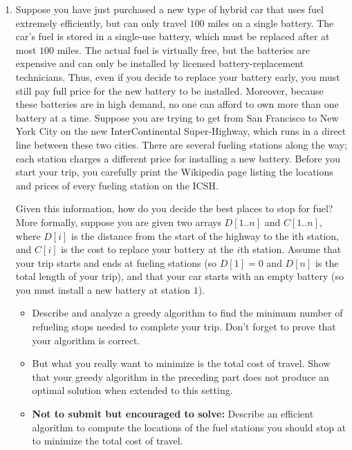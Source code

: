 \documentclass[11pt]{article}
\begin{document}
\begin{enumerate}
\item Suppose you have just purchased a new type of hybrid car that
  uses fuel extremely efficiently, but can only travel $100$ miles on a
  single battery. The car’s fuel is stored in a single-use battery,
  which must be replaced after at most $100$ miles. The actual fuel is
  virtually free, but the batteries are expensive and can only be
  installed by licensed battery-replacement technicians. Thus, even if
  you decide to replace your battery early, you must still pay full
  price for the new battery to be installed. Moreover, because these
  batteries are in high demand, no one can afford to own more than one
  battery at a time.  Suppose you are trying to get from San Francisco
  to New York City on the new InterContinental Super-Highway, which
  runs in a direct line between these two cities. There are several
  fueling stations along the way; each station charges a different
  price for installing a new battery. Before you start your trip, you
  carefully print the Wikipedia page listing the locations and prices
  of every fueling station on the ICSH.

  Given this information, how do
  you decide the best places to stop for fuel?  More formally, suppose
  you are given two arrays $D[1 .. n]$ and $C[1 .. n]$, where $D[i]$ is the
  distance from the start of the highway to the ith station, and $C[i]$
  is the cost to replace your battery at the $i$th station. Assume that
  your trip starts and ends at fueling stations (so $D[1] = 0$ and $D[n]$
  is the total length of your trip), and that your car starts with an
  empty battery (so you must install a new battery at station $1$).


  \begin{itemize}
  \item   Describe and analyze a greedy algorithm to find the minimum number
  of refueling stops needed to complete your trip. Don’t forget to
  prove that your algorithm is correct.
\item But what you really want
  to minimize is the total cost of travel. Show that your greedy
  algorithm in the preceding part does not produce an optimal solution when
  extended to this setting.
\item {\bf Not to submit but encouraged to solve:} Describe an efficient algorithm to
  compute the locations of the fuel stations you should stop at to
  minimize the total cost of travel.
  \end{itemize}


\end{enumerate}
\end{document}
